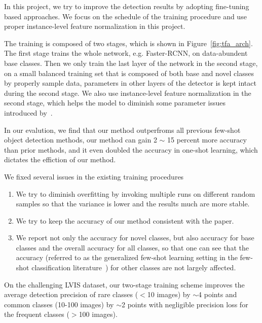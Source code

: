 In this project, we try to improve the detection results by adopting fine-tuning based approaches. We focus on the schedule of the training procedure and use proper instance-level feature normalization in this project.

The training is composed of two stages, which is shown in Figure~\ref{fig:tfa_arch}. The first stage trains the whole network, e.g. Faster-RCNN, on data-abundent base classes. Then we only train the last layer of the network in the second stage, on a small balanced training set that is composed of both base and novel classes by properly sample data, parameters in other layers of the detector is kept intact during the second stage. We also use instance-level feature normalization in the second stage, which helps the model to diminish some parameter issues introduced by~\citet{gidaris2018dynamic,qi2018low,chen2019closer}.

In our evalution, we find that our method outperfroms all previous few-shot object detection methods, our method can gain 2 $\sim$ 15 percent more accuracy than prior methods, and it even doubled the accuracy in one-shot learning, which dictates the effiction of our method.

We fixed several issues in the existing training procedures
\begin{enumerate}
    \item We try to diminish overfitting by invoking multiple runs on different random samples so that the variance is lower and the results much are more stable.
    \item We try to keep the accuracy of our method consistent with the paper.
    \item We report not only the accuracy for novel classes, but also accuracy for base classes and the overall accuracy for all classes, so that one can see that the accuracy (referred to as the generalized few-shot learning setting in the few-shot classification literature~\cite{hariharan2017low,wang2019tafe}) for other classes are not largely affected.
\end{enumerate}

On the challenging LVIS dataset, our two-stage training scheme improves the average detection precision of rare classes
($<$10 images) by $\sim$4 points and common classes (10-100 images) by $\sim$2 points with negligible precision loss for the frequent classes ($>$100 images).

